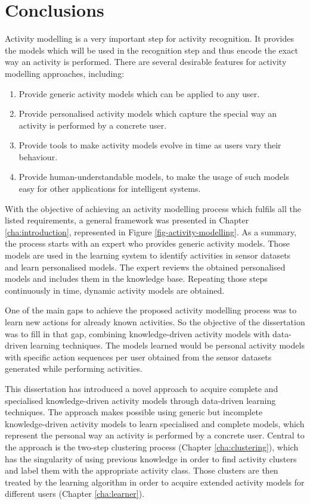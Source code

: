 \section{Conclusions}
\label{sec:conclusions:conclusions}

Activity modelling is a very important step for activity recognition. It provides the models which will be used in the recognition step and thus encode the exact way an activity is performed. There are several desirable features for activity modelling approaches, including:

\begin{enumerate}
 \item Provide generic activity models which can be applied to any user.
 \item Provide personalised activity models which capture the special way an activity is performed by a concrete user.
 \item Provide tools to make activity models evolve in time as users vary their behaviour.
 \item Provide human-understandable models, to make the usage of such models easy for other applications for intelligent systems.
\end{enumerate}

With the objective of achieving an activity modelling process which fulfils all the listed requirements, a general framework was presented in Chapter \ref{cha:introduction}, represented in Figure \ref{fig-activity-modelling}. As a summary, the process starts with an expert who provides generic activity models. Those models are used in the learning system to identify activities in sensor datasets and learn personalised models. The expert reviews the obtained personalised models and includes them in the knowledge base. Repeating those steps continuously in time, dynamic activity models are obtained.

One of the main gaps to achieve the proposed activity modelling process was to learn new actions for already known activities. So the objective of the dissertation was to fill in that gap, combining knowledge-driven activity models with data-driven learning techniques. The models learned would be personal activity models with specific action sequences per user obtained from the sensor datasets generated while performing activities.

This dissertation has introduced a novel approach to acquire complete and specialised knowledge-driven activity models through data-driven learning techniques. The approach makes possible using generic but incomplete knowledge-driven activity models to learn specialised and complete models, which represent the personal way an activity is performed by a concrete user. Central to the approach is the two-step clustering process (Chapter \ref{cha:clustering}), which has the singularity of using previous knowledge in order to find activity clusters and label them with the appropriate activity class. Those clusters are then treated by the learning algorithm in order to acquire extended activity models for different users (Chapter \ref{cha:learner}).

